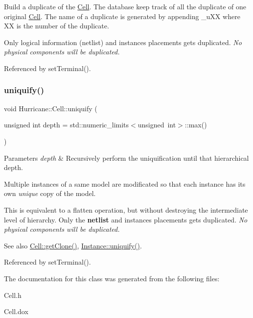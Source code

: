 Build a duplicate of the \hyperlink{classHurricane_1_1Cell}{Cell}. The database keep track of all the duplicate of one original \hyperlink{classHurricane_1_1Cell}{Cell}. The name of a duplicate is generated by appending {\ttfamily \textquotesingle{}\+\_\+u\+XX\textquotesingle{}} where {\ttfamily \textquotesingle{}XX\textquotesingle{}} is the number of the duplicate.

Only logical information (netlist) and instance\textquotesingle{}s placements gets duplicated. {\itshape No physical components will be duplicated.} 

Referenced by set\+Terminal().

\mbox{\label{classHurricane_1_1Cell_aa113c121813342b6304f3e7fddbc8565}} 
\subsubsection{\texorpdfstring{uniquify()}{uniquify()}}
{\footnotesize\ttfamily void Hurricane\+::\+Cell\+::uniquify (\begin{DoxyParamCaption}\item[{unsigned int}]{depth = {\ttfamily std\+:\+:numeric\+\_\+limits$<$unsigned~int$>$\+:\+:max()} }\end{DoxyParamCaption})}


\begin{DoxyParams}{Parameters}
{\em depth} & Recursively perform the uniquification until that hierarchical depth.\\
\hline
\end{DoxyParams}
Multiple instances of a same model are modificated so that each instance has it\textquotesingle{}s own {\itshape unique} copy of the model.

This is equivalent to a flatten operation, but without destroying the intermediate level of hierarchy. Only the {\bfseries netlist} and instance\textquotesingle{}s placements gets duplicated. {\itshape No physical components will be duplicated.}

\begin{DoxySeeAlso}{See also}
\hyperlink{classHurricane_1_1Cell_a092f53c7f517ecc70d9ba375296c5d5b}{Cell\+::get\+Clone()}, \hyperlink{classHurricane_1_1Instance_adf28fcd01f6ff89c5435e83482f66d4c}{Instance\+::uniquify()}. 
\end{DoxySeeAlso}


Referenced by set\+Terminal().



The documentation for this class was generated from the following files\+:\begin{DoxyCompactItemize}
\item 
Cell.\+h\item 
Cell.\+dox\end{DoxyCompactItemize}
